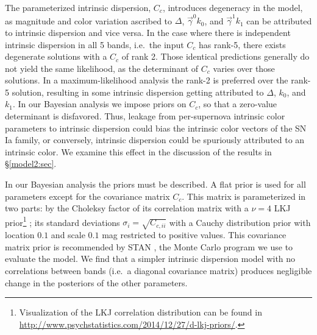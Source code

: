 \documentclass{aastex61}   	%
\begin{document}
The parameterized intrinsic dispersion, $C_c$,  introduces degeneracy in the model, as magnitude and color variation
ascribed to $\Delta$, $\vec{\gamma}^0 k_0$, and $\vec{\gamma}^1 k_1$ can  be attributed to intrinsic dispersion
\color{blue}
and vice versa.
In the case where there is independent intrinsic dispersion in all 5 bands, i.e.\  the input $C_c$ has rank-5, there exists degenerate solutions with a $C_c$ of rank 2.  Those identical predictions generally do not yield the same likelihood, as the determinant of $C_c$ varies over those solutions.  In a maximum-likelihood analysis the rank-2 is preferred over the rank-5 solution, resulting in some intrinsic dispersion getting attributed to $\Delta$, $k_0$, and $k_1$.
In our Bayesian analysis we impose priors on $C_c$, so that a zero-value determinant is disfavored.    
Thus, leakage from per-supernova intrinsic color parameters to intrinsic dispersion could bias the intrinsic color vectors of the SN Ia family,  or conversely, intrinsic dispersion could be spuriously attributed to an intrinsic color.  We examine this effect in the discussion of the results in \S\ref{model2:sec}.
\color{black}
%



In our Bayesian analysis the priors must be described.  A flat prior is used for all parameters except
for the covariance matrix $C_c$.
\color{red}
This matrix is parameterized in two parts: by the Choleksy factor of its
\color{black}
correlation matrix with a $\nu=4$  LKJ prior\footnote{
Visualization of the LKJ correlation distribution can be found in \url{http://www.psychstatistics.com/2014/12/27/d-lkj-priors/}.}
\citep{Lewandowski20091989}; its standard
deviations $\sigma_i = \sqrt{C_{c,ii}}$ with a  Cauchy distribution prior with location
 $0.1$ and scale $0.1$ mag restricted to positive values.
This covariance matrix prior is recommended by STAN \citep{stan}, the Monte Carlo program we use to evaluate the model.
 We find that a simpler intrinsic dispersion model with no correlations between bands
 (i.e.\ a  diagonal covariance matrix) produces \color{red} negligible \color{black} change in the posteriors of
 the other parameters.
\end{document}
